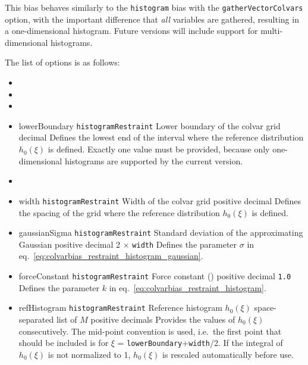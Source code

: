 This bias behaves similarly to the \texttt{histogram} bias with the \texttt{gatherVectorColvars} option, with the important difference that \emph{all} variables are gathered, resulting in a one-dimensional histogram.
Future versions will include support for multi-dimensional histograms.

The list of options is as follows:
\begin{itemize}

\item {}
\item {}
\item {}

\item %
  \key
    {lowerBoundary}{%
    \texttt{histogramRestraint}}{%
    Lower boundary of the colvar grid}{%
    decimal}{%
    Defines the lowest end of the interval where the reference distribution $h_{0}(\xi)$ is defined.
    Exactly one value must be provided, because only one-dimensional histograms are supported by the current version.
  }

\item %

\item %
  \key
  {width}{%
    \texttt{histogramRestraint}}{%
    Width of the colvar grid}{%
    positive decimal}{%
    Defines the spacing of the grid where the reference distribution $h_{0}(\xi)$ is defined.
  }

\item %
  \keydef
  {gaussianSigma}{%
    \texttt{histogramRestraint}}{%
    Standard deviation of the approximating Gaussian}{%
    positive decimal}{%
    2 $\times$ \texttt{width}}{%
    Defines the parameter $\sigma$ in eq.~\ref{eq:colvarbias_restraint_histogram_gaussian}.
  }

\item %
  \keydef
    {forceConstant}{%
    \texttt{histogramRestraint}}{%
    Force constant (\energyunit)}{%
    positive decimal}{%
    \texttt{1.0}}{%
    Defines the parameter $k$ in eq.~\ref{eq:colvarbias_restraint_histogram}.
  }

\item %
  \key
  {refHistogram}{%
    \texttt{histogramRestraint}}{%
    Reference histogram $h_{0}(\xi)$}{%
    space-separated list of $M$ positive decimals}{%
    Provides the values of $h_{0}(\xi)$ consecutively.
    The mid-point convention is used, i.e.~the first point that should be included is for $\xi$ = \texttt{lowerBoundary}+\texttt{width}/2.
    If the integral of $h_{0}(\xi)$ is not normalized to 1, $h_{0}(\xi)$ is rescaled automatically before use.
  }


\end{itemize}
